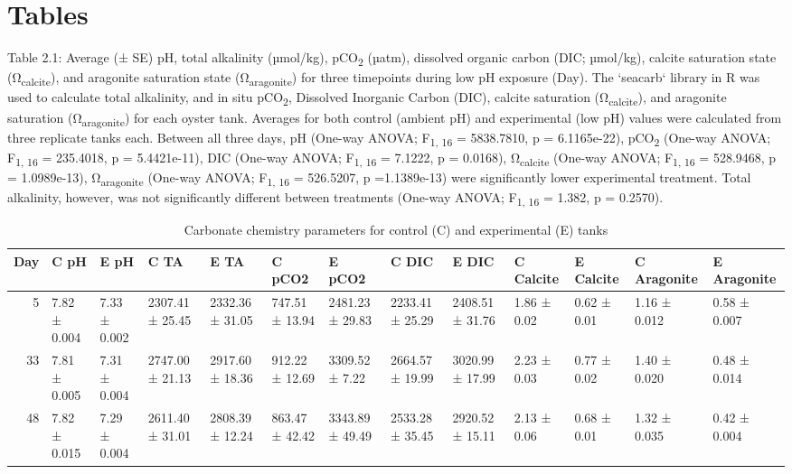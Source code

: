 \documentclass [11pt, proquest] {uwthesis}[2015/03/03]
\begin{document}
\hypertarget{tables-1}{%
\section{Tables}\label{tables-1}}
\begin{landscape}

Table 2.1: Average (± SE) pH, total alkalinity (µmol/kg), pCO\textsubscript{2} (µatm), dissolved organic carbon (DIC; µmol/kg), calcite saturation state (Ω\textsubscript{calcite}), and aragonite saturation state (Ω\textsubscript{aragonite}) for three timepoints during low pH exposure (Day). The `seacarb` library in R was used to calculate total alkalinity, and in situ pCO\textsubscript{2}, Dissolved Inorganic Carbon (DIC), calcite saturation (Ω\textsubscript{calcite}), and aragonite saturation (Ω\textsubscript{aragonite}) for each oyster tank. Averages for both control (ambient pH) and experimental (low pH) values were calculated from three replicate tanks each. Between all three days, pH (One-way ANOVA; F\textsubscript{1, 16} = 5838.7810, p = 6.1165e-22), pCO\textsubscript{2} (One-way ANOVA; F\textsubscript{1, 16} = 235.4018, p = 5.4421e-11), DIC (One-way ANOVA; F\textsubscript{1, 16} = 7.1222, p = 0.0168), Ω\textsubscript{calcite} (One-way ANOVA; F\textsubscript{1, 16} = 528.9468, p = 1.0989e-13), Ω\textsubscript{aragonite} (One-way ANOVA; F\textsubscript{1, 16} = 526.5207, p =1.1389e-13) were significantly lower experimental treatment. Total alkalinity, however, was not significantly different between treatments (One-way ANOVA; F\textsubscript{1, 16} = 1.382, p = 0.2570).

\begingroup\fontsize{5}{7}\selectfont
\begin{longtable}[t]{rllllllllllll}
\caption{\label{tab:carbchem}Carbonate chemistry parameters for control (C) and experimental (E) tanks}\\
\toprule
Day & C pH & E pH & C TA & E TA & C pCO2 & E pCO2 & C DIC & E DIC & C Calcite & E Calcite & C Aragonite & E Aragonite\\
\midrule
5 & 7.82 ± 0.004 & 7.33 ± 0.002 & 2307.41 ± 25.45 & 2332.36 ± 31.05 & 747.51 ± 13.94 & 2481.23 ± 29.83 & 2233.41 ± 25.29 & 2408.51 ± 31.76 & 1.86 ± 0.02 & 0.62 ± 0.01 & 1.16 ± 0.012  & 0.58 ± 0.007\\
33 & 7.81 ± 0.005 & 7.31 ± 0.004 & 2747.00 ± 21.13 & 2917.60 ± 18.36 & 912.22 ± 12.69 & 3309.52 ± 7.22 & 2664.57 ± 19.99 & 3020.99 ± 17.99 & 2.23 ± 0.03 & 0.77 ± 0.02 & 1.40 ± 0.020 & 0.48 ± 0.014\\
48 & 7.82 ± 0.015 & 7.29 ± 0.004 & 2611.40 ± 31.01 & 2808.39 ± 12.24 & 863.47 ± 42.42 & 3343.89 ± 49.49 & 2533.28 ± 35.45 & 2920.52 ± 15.11 & 2.13 ± 0.06 & 0.68 ± 0.01 & 1.32 ± 0.035 & 0.42 ± 0.004\\
\bottomrule
\end{longtable}
\endgroup{}

\end{landscape}
\clearpage
\end{document}

